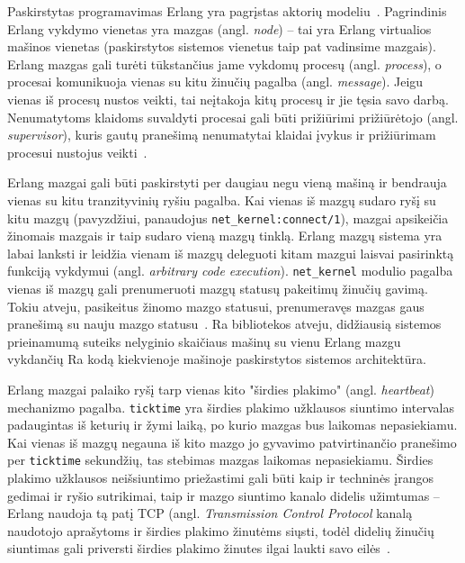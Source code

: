 \documentclass{VUMIFPSkursinis}
\begin{document}
Paskirstytas programavimas Erlang yra pagrįstas aktorių modeliu~\cite{farrugia_towards_nodate, agha_actors_1985}. Pagrindinis Erlang vykdymo vienetas yra mazgas (angl. \textit{node}) -- tai yra Erlang virtualios mašinos vienetas (paskirstytos sistemos vienetus taip pat vadinsime mazgais). Erlang mazgas gali turėti tūkstančius jame vykdomų procesų (angl. \textit{process}), o procesai komunikuoja vienas su kitu žinučių pagalba (angl. \textit{message}). Jeigu vienas iš procesų nustos veikti, tai neįtakoja kitų procesų ir jie tęsia savo darbą. Nenumatytoms klaidoms suvaldyti procesai gali būti prižiūrimi prižiūrėtojo (angl. \textit{supervisor}), kuris gautų pranešimą nenumatytai klaidai įvykus ir prižiūrimam procesui nustojus veikti~\cite{erlang_distributed}.

Erlang mazgai gali būti paskirstyti per daugiau negu vieną mašiną ir bendrauja vienas su kitu tranzityvinių ryšiu pagalba. Kai vienas iš mazgų sudaro ryšį su kitu mazgų (pavyzdžiui, panaudojus \texttt{net\_kernel:connect/1}), mazgai apsikeičia žinomais mazgais ir taip sudaro vieną mazgų tinklą. Erlang mazgų sistema yra labai lanksti ir leidžia vienam iš mazgų deleguoti kitam mazgui laisvai pasirinktą funkciją vykdymui (angl. \textit{arbitrary code execution}). \texttt{net\_kernel} modulio pagalba vienas iš mazgų gali prenumeruoti mazgų statusų pakeitimų žinučių gavimą. Tokiu atveju, pasikeitus žinomo mazgo statusui, prenumeravęs mazgas gaus pranešimą su nauju mazgo statusu~\cite{erlang_distributed, hebert_learn_2013}. Ra bibliotekos atveju, didžiausią sistemos prieinamumą suteiks nelyginio skaičiaus mašinų su vienu Erlang mazgu vykdančių Ra kodą kiekvienoje mašinoje paskirstytos sistemos architektūra.

Erlang mazgai palaiko ryšį tarp vienas kito "širdies plakimo" (angl. \emph{heartbeat}) mechanizmo pagalba. \texttt{ticktime} yra širdies plakimo užklausos siuntimo intervalas padaugintas iš keturių ir žymi laiką, po kurio mazgas bus laikomas nepasiekiamu. Kai vienas iš mazgų negauna iš kito mazgo jo gyvavimo patvirtinančio pranešimo per \texttt{ticktime} sekundžių, tas stebimas mazgas laikomas nepasiekiamu. Širdies plakimo užklausos neišsiuntimo priežastimi gali būti kaip ir techninės įrangos gedimai ir ryšio sutrikimai, taip ir mazgo siuntimo kanalo didelis užimtumas -- Erlang naudoja tą patį TCP (angl. \emph{Transmission Control Protocol} kanalą naudotojo aprašytoms ir širdies plakimo žinutėms siųsti, todėl didelių žinučių siuntimas gali priversti širdies plakimo žinutes ilgai laukti savo eilės~\cite{hebert_learn_2013}.
\end{document}
